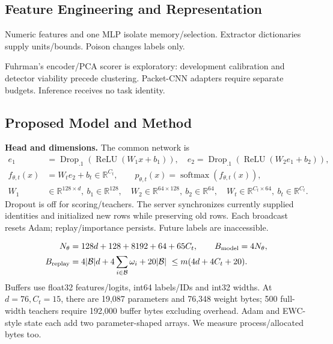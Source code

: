 \documentclass[10pt,a4paper]{article}
\begin{document}
\subsection{Feature Engineering and Representation}
Numeric features and one MLP isolate memory/selection. Extractor dictionaries supply units/bounds. Poison changes labels only.

Fuhrman's encoder/PCA scorer is exploratory: development calibration and detector viability precede clustering. Packet-CNN adapters require separate budgets. Inference receives no task identity.

\subsection{Proposed Model and Method}
\textbf{Head and dimensions.} The common network is
\begin{equation}
\begin{aligned}
e_1&=\operatorname{Drop}_{.1}(\operatorname{ReLU}(W_1x+b_1)),\quad
e_2=\operatorname{Drop}_{.1}(\operatorname{ReLU}(W_2e_1+b_2)),\\
f_{\theta,t}(x)&=W_te_2+b_t\in\mathbb R^{C_t},\qquad
p_{\theta,t}(x)=\operatorname{softmax}(f_{\theta,t}(x)),\\
W_1&\in\mathbb R^{128\times d},\ b_1\in\mathbb R^{128},\quad
W_2\in\mathbb R^{64\times128},\ b_2\in\mathbb R^{64},\quad
W_t\in\mathbb R^{C_t\times64},\ b_t\in\mathbb R^{C_t}.
\end{aligned}
\label{eq:head}
\end{equation}
Dropout is off for scoring/teachers. The server synchronizes currently supplied identities and initialized new rows while preserving old rows. Each broadcast resets Adam; replay/importance persists. Future labels are inaccessible.

\begin{equation}
\begin{aligned}
N_\theta&=128d+128+8192+64+65C_t,\qquad B_{\rm model}=4N_\theta,\\
B_{\rm replay}&=4|\mathcal B|d+4\sum_{i\in\mathcal B}\omega_i+20|\mathcal B|\ \le m(4d+4C_t+20).
\end{aligned}
\label{eq:bytes}
\end{equation}
Buffers use float32 features/logits, int64 labels/IDs and int32 widths. At $d=76,C_t=15$, there are 19,087 parameters and 76,348 weight bytes; 500 full-width teachers require 192,000 buffer bytes excluding overhead. Adam and EWC-style state each add two parameter-shaped arrays. We measure process/allocated bytes too.
\end{document}
